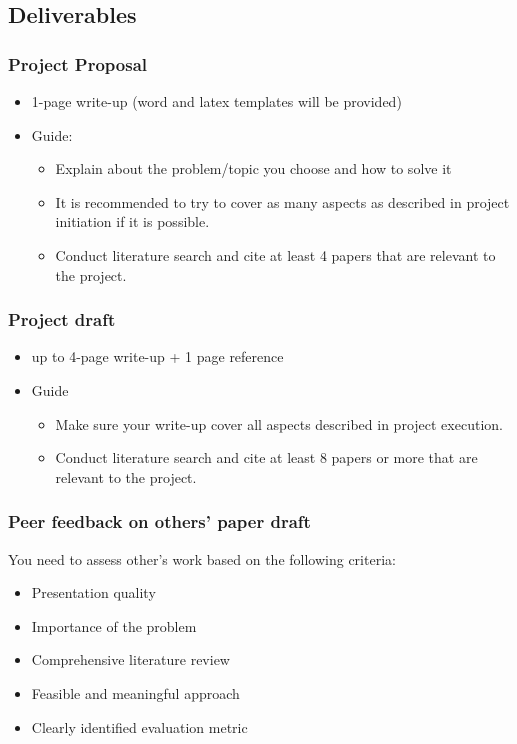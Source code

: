\documentclass[journal]{IEEEtran}
\begin{document}
\subsection{Deliverables}

\subsubsection{Project Proposal}
\begin{itemize}
\item 1-page write-up (word and latex templates will be provided)
\item Guide: 
\begin{itemize}
\item Explain about the problem/topic you choose and how to solve it
\item It is recommended to try to cover as many aspects as described in project initiation if it is possible.
\item Conduct literature search and cite at least 4 papers that are relevant to the project.
\end{itemize} 
\end{itemize}

\subsubsection{Project draft}
\begin{itemize}
\item up to 4-page write-up + 1 page reference
\item Guide
\begin{itemize}
\item Make sure your write-up cover all aspects described in project execution.
\item Conduct literature search and cite at least 8 papers or more that are relevant to the project.
\end{itemize}
\end{itemize}

\subsubsection{Peer feedback on others' paper draft}
You need to assess other's work based on the following criteria:
\begin{itemize}
\item Presentation quality
\item Importance of the problem
\item Comprehensive literature review
\item Feasible and meaningful approach
\item Clearly identified evaluation metric
\end{itemize}
\end{document}
